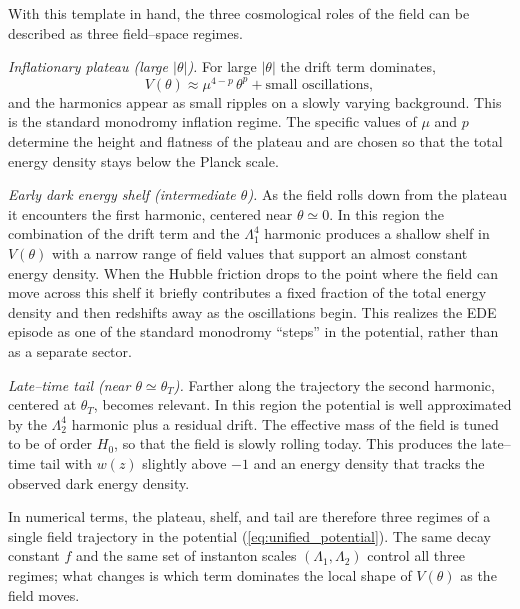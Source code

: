 \documentclass[a4paper,11pt]{article}
\begin{document}
With this template in hand, the three cosmological roles of the field can be described as three field–space regimes.

\textit{Inflationary plateau (large $|\theta|$).} For large $|\theta|$ the drift term dominates,
\begin{equation}
    V(\theta) \approx \mu^{4-p}\,\theta^{p} + \text{small oscillations},
\end{equation}
and the harmonics appear as small ripples on a slowly varying background. This is the standard monodromy inflation regime. The specific values of $\mu$ and $p$ determine the height and flatness of the plateau and are chosen so that the total energy density stays below the Planck scale.

\textit{Early dark energy shelf (intermediate $\theta$).} As the field rolls down from the plateau it encounters the first harmonic, centered near $\theta \simeq 0$. In this region the combination of the drift term and the $\Lambda_1^4$ harmonic produces a shallow shelf in $V(\theta)$ with a narrow range of field values that support an almost constant energy density. When the Hubble friction drops to the point where the field can move across this shelf it briefly contributes a fixed fraction of the total energy density and then redshifts away as the oscillations begin. This realizes the EDE episode as one of the standard monodromy ``steps'' in the potential, rather than as a separate sector.

\textit{Late–time tail (near $\theta \simeq \theta_T$).} Farther along the trajectory the second harmonic, centered at $\theta_T$, becomes relevant. In this region the potential is well approximated by the $\Lambda_2^4$ harmonic plus a residual drift. The effective mass of the field is tuned to be of order $H_0$, so that the field is slowly rolling today. This produces the late–time tail with $w(z)$ slightly above $-1$ and an energy density that tracks the observed dark energy density.

In numerical terms, the plateau, shelf, and tail are therefore three regimes of a single field trajectory in the potential (\ref{eq:unified_potential}). The same decay constant $f$ and the same set of instanton scales $(\Lambda_1, \Lambda_2)$ control all three regimes; what changes is which term dominates the local shape of $V(\theta)$ as the field moves.

\end{document}
